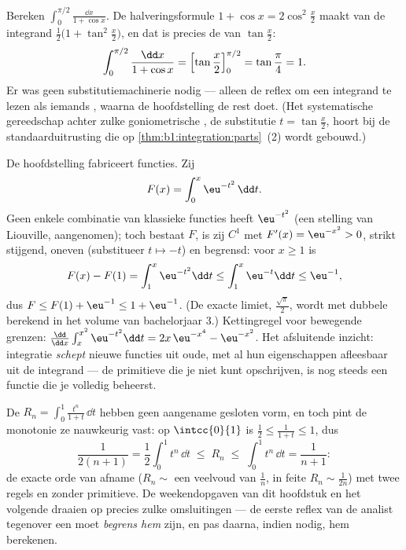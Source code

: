 \begin{example}\label{ex:b1:integration:halfangle}
Bereken $\displaystyle\int_0^{\pi/2} \frac{\dd x}{1 + \cos x}$.
De halveringsformule $1 + \cos x = 2\cos^2\frac x2$ maakt van de
integrand $\frac{1}{2}\bigl(1 + \tan^2\frac x2\bigr)$, en dat is
precies de  van $\tan\frac x2$:
\[
\int_0^{\pi/2} \frac{\dd x}{1 + \cos x}
= \Bigl[\tan\frac x2\Bigr]_0^{\pi/2} = \tan\frac\pi4 = 1 .
\]
Er was geen substitutiemachinerie nodig --- alleen de reflex om
een integrand te lezen als iemands , waarna de
hoofdstelling de rest doet. (Het systematische gereedschap achter
zulke goniometrische , de substitutie $t = \tan\frac
x2$, hoort bij de standaarduitrusting die op
\cref{thm:b1:integration:parts}~(2) wordt gebouwd.)
\end{example}

\begin{example}\label{ex:b1:integration:definedby}
De hoofdstelling fabriceert functies. Zij
\[
F(x) = \int_0^x \eu^{-t^2}\,\dd t .
\]
Geen enkele combinatie van klassieke functies heeft 
$\eu^{-t^2}$ (een stelling van Liouville, aangenomen); toch
bestaat $F$, is zij $C^1$ met $F'(x) = \eu^{-x^2} > 0$, strikt
stijgend, oneven (substitueer $t \mapsto -t$) en begrensd: voor
$x \geq 1$ is
\[
F(x) - F(1) = \int_1^x \eu^{-t^2}\dd t
\leq \int_1^x \eu^{-t}\dd t \leq \eu^{-1} ,
\]
dus $F \leq F(1) + \eu^{-1} \leq 1 + \eu^{-1}$. (De exacte
limiet, $\frac{\sqrt\pi}{2}$, wordt met dubbele 
berekend in het volume van bachelorjaar 3.) Kettingregel voor
bewegende grenzen: $\frac{\dd}{\dd x}\int_x^{x^2} \eu^{-t^2}\dd t
= 2x\,\eu^{-x^4} - \eu^{-x^2}$. Het afsluitende inzicht:
integratie \emph{schept} nieuwe functies uit oude, met al hun
eigenschappen afleesbaar uit de integrand --- de primitieve die
je niet kunt opschrijven, is nog steeds een functie die je
volledig beheerst.
\end{example}

\begin{example}\label{ex:b1:integration:estimate}
De  $R_n = \int_0^1 \frac{t^n}{1 + t}\,\dd t$ hebben
geen aangename gesloten vorm, en toch pint de monotonie ze
nauwkeurig vast: op $\intcc{0}{1}$ is $\frac12 \leq
\frac{1}{1+t} \leq 1$, dus
\[
\frac{1}{2(n+1)} = \frac12\int_0^1 t^n\,\dd t
\;\leq\; R_n \;\leq\; \int_0^1 t^n \,\dd t = \frac{1}{n+1} :
\]
de exacte orde van afname ($R_n \sim$ een veelvoud van $\frac1n$,
in feite $R_n \sim \frac{1}{2n}$) met twee regels en zonder
primitieve. De weekendopgaven van dit hoofdstuk en het volgende
draaien op precies zulke omsluitingen --- de eerste reflex van
de analist tegenover een  moet \emph{begrens hem} zijn,
en pas daarna, indien nodig, hem berekenen.
\end{example}

